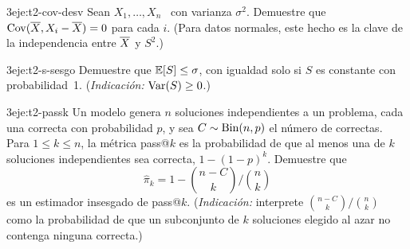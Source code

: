 \begin{ejercicio}{3}{eje:t2-cov-desv}
Sean $X_1,\dots,X_n$ \iid\ con varianza $\sigma^{2}$. Demuestre que $\operatorname{Cov}(\overline{X},X_i-\overline{X})=0$ para cada $i$. (Para datos normales, este hecho es la clave de la independencia entre $\overline{X}$ y $S^{2}$.)
\end{ejercicio}

\begin{ejercicio}{3}{eje:t2-s-sesgo}
Demuestre que $\mathbb{E}[S]\le\sigma$, con igualdad solo si $S$ es constante con probabilidad~1. (\emph{Indicación:} $\operatorname{Var}(S)\ge0$.)
\end{ejercicio}

\begin{ejercicio}{3}{eje:t2-passk}
Un modelo genera $n$ soluciones independientes a un problema, cada una correcta con probabilidad $p$, y sea $C\sim\operatorname{Bin}(n,p)$ el número de correctas. Para $1\le k\le n$, la métrica pass@$k$ es la probabilidad de que al menos una de $k$ soluciones independientes sea correcta, $1-(1-p)^{k}$. Demuestre que
\[
\widehat{\pi}_k=1-\binom{n-C}{k}\Big/\binom{n}{k}
\]
es un estimador insesgado de pass@$k$. (\emph{Indicación:} interprete $\binom{n-C}{k}/\binom nk$ como la probabilidad de que un subconjunto de $k$ soluciones elegido al azar no contenga ninguna correcta.)
\end{ejercicio}
